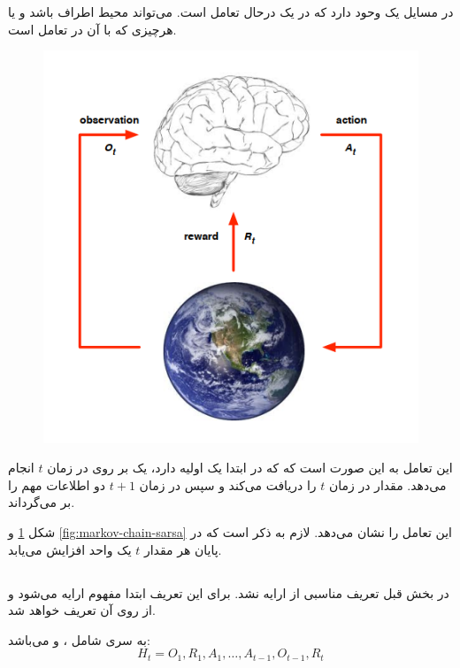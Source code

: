  در مسایل  یک 
 \textbf{}
 وحود دارد که در یک \textbf{} درحال تعامل است.  می‌تواند محیط اطراف  باشد و یا هرچیزی که  با آن در تعامل است.
  \cite{uclRL}
\begin{figure}[t]
	\centering
	\includegraphics[width=0.7\linewidth]{Figures/RL/Enviroment-brain-as-agent}
	\caption{}
	\label{fig:enviroment-brain-as-agent}
\end{figure}

این تعامل به این صورت است که  که در ابتدا یک  اولیه دارد، یک  بر روی  در زمان $t$ انجام می‌دهد. 
 مقدار  در زمان $t$ را دریافت می‌کند و 
سپس  در زمان $t+1$ دو اطلاعات مهم را بر می‌گرداند. 
\begin{alphinline}
	\item {}
	\item {}
\end{alphinline}

شکل 
\ref{fig:enviroment-brain-as-agent}
و \ref{fig:markov-chain-sarsa}
این تعامل را نشان می‌دهد. لازم به ذکر است که در پایان هر  مقدار $t$ یک واحد افزایش می‌یابد.

\subsection{}
در بخش قبل تعریف مناسبی از  ارایه نشد. برای این تعریف ابتدا مفهوم  ارایه می‌شود و از روی آن  تعریف خواهد شد.

\begin{definition}[\w{history}]
	به سری شامل ،  و  می‌باشد:
	\[
	H_t = O_1 ,R_1, A_1, \dots, A_{t-1}, O_{t-1}, R_t
	\]
\end{definition}


